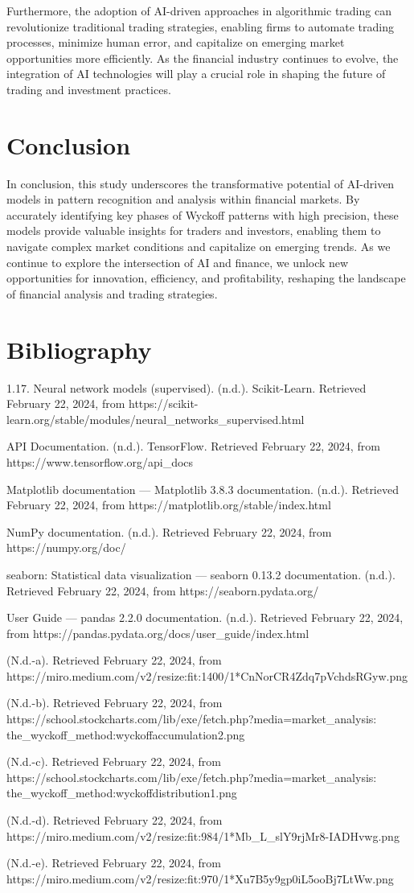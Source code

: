 \documentclass{article}
\begin{document}
Furthermore, the adoption of AI-driven approaches in algorithmic trading can revolutionize traditional trading strategies, enabling firms to automate trading processes, minimize human error, and capitalize on emerging market opportunities more efficiently. As the financial industry continues to evolve, the integration of AI technologies will play a crucial role in shaping the future of trading and investment practices.


\section{Conclusion}
In conclusion, this study underscores the transformative potential of AI-driven models in pattern recognition and analysis within financial markets. By accurately identifying key phases of Wyckoff patterns with high precision, these models provide valuable insights for traders and investors, enabling them to navigate complex market conditions and capitalize on emerging trends. As we continue to explore the intersection of AI and finance, we unlock new opportunities for innovation, efficiency, and profitability, reshaping the landscape of financial analysis and trading strategies.
\clearpage
\section{Bibliography}
1.17. Neural network models (supervised). (n.d.). Scikit-Learn. Retrieved February 22, 2024, from https://scikit-learn.org/stable/modules/neural\_networks\_supervised.html

API Documentation. (n.d.). TensorFlow. Retrieved February 22, 2024, from https://www.tensorflow.org/api\_docs

Matplotlib documentation — Matplotlib 3.8.3 documentation. (n.d.). Retrieved February 22, 2024, from https://matplotlib.org/stable/index.html

NumPy documentation. (n.d.). Retrieved February 22, 2024, from https://numpy.org/doc/

seaborn: Statistical data visualization — seaborn 0.13.2 documentation. (n.d.). Retrieved February 22, 2024, from https://seaborn.pydata.org/

User Guide — pandas 2.2.0 documentation. (n.d.). Retrieved February 22, 2024, from https://pandas.pydata.org/docs/user\_guide/index.html

(N.d.-a). Retrieved February 22, 2024, from https://miro.medium.com/v2/resize:fit:1400/1*CnNorCR4Zdq7pVchdsRGyw.png

(N.d.-b). Retrieved February 22, 2024, from https://school.stockcharts.com/lib/exe/fetch.php?media=market\_analysis:
the\_wyckoff\_method:wyckoffaccumulation2.png

(N.d.-c). Retrieved February 22, 2024, from https://school.stockcharts.com/lib/exe/fetch.php?media=market\_analysis:
the\_wyckoff\_method:wyckoffdistribution1.png

(N.d.-d). Retrieved February 22, 2024, from https://miro.medium.com/v2/resize:fit:984/1*Mb\_L\_slY9rjMr8-IADHvwg.png

(N.d.-e). Retrieved February 22, 2024, from https://miro.medium.com/v2/resize:fit:970/1*Xu7B5y9gp0iL5ooBj7LtWw.png
\end{document}
